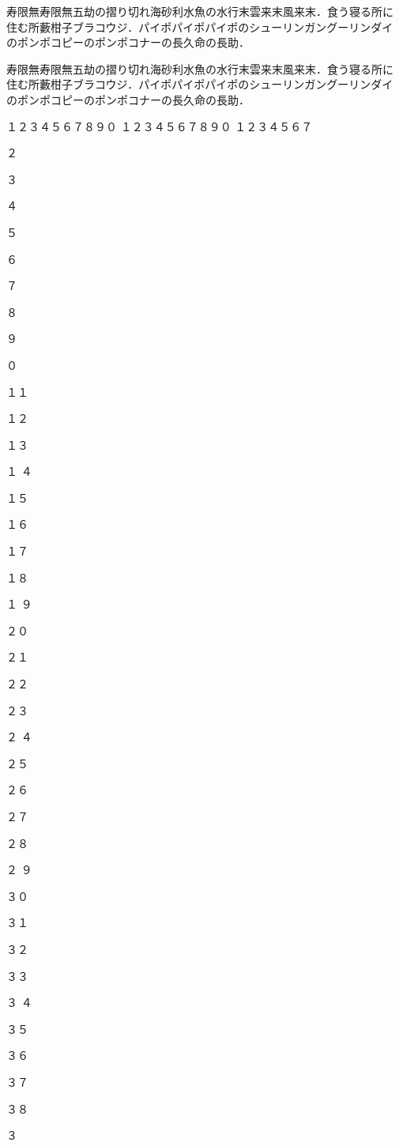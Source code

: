 \documentclass[a4j, 12Q, twocolumn, twoside, draft]{jsarticle}
\begin{document}
寿限無寿限無五劫の摺り切れ海砂利水魚の水行末雲来末風来末．食う寝る所に
住む所藪柑子ブラコウジ．パイポパイポパイポのシューリンガングーリンダイ
のポンポコピーのポンポコナーの長久命の長助．

寿限無寿限無五劫の摺り切れ海砂利水魚の水行末雲来末風来末．食う寝る所に
住む所藪柑子ブラコウジ．パイポパイポパイポのシューリンガングーリンダイ
のポンポコピーのポンポコナーの長久命の長助．

\newpage
\noindent １２３４５６７８９０
１２３４５６７８９０
１２３４５６７%
\par \noindent ２\par \noindent ３\par \noindent ４\par \noindent ５\par
\noindent ６\par \noindent ７\par \noindent ８\par \noindent ９\par \noindent ０\par
\noindent １１\par \noindent １２\par \noindent １３\par \noindent １
４\par \noindent １５\par
\noindent １６\par \noindent １７\par \noindent １８\par \noindent １
９\par \noindent ２０\par
\noindent ２１\par \noindent ２２\par \noindent ２３\par \noindent ２
４\par \noindent ２５\par
\noindent ２６\par \noindent ２７\par \noindent ２８\par \noindent ２
９\par \noindent ３０\par
\noindent ３１\par \noindent ３２\par \noindent ３３\par \noindent ３
４\par \noindent ３５\par
\noindent ３６\par \noindent ３７\par \noindent ３８\par \noindent ３
\end{document}

